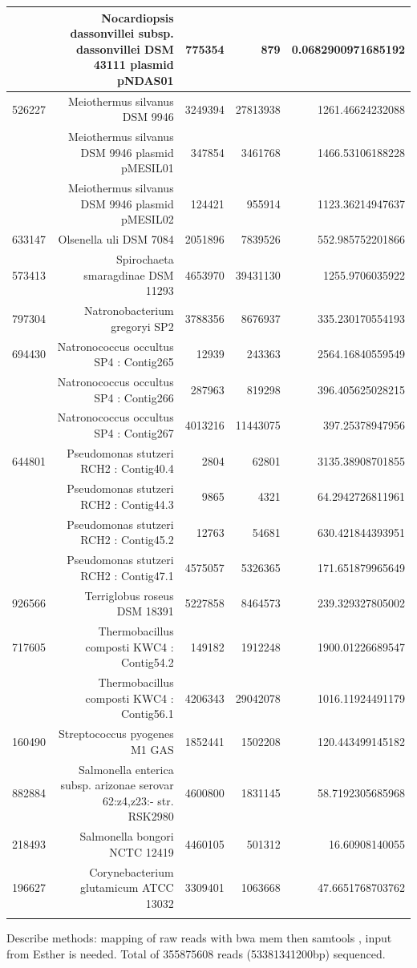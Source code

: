\documentclass{bioinfo2}
\begin{document}
\begin{table}[p]
{\begin{tabular}{lrrrr}
&Nocardiopsis dassonvillei subsp. dassonvillei DSM 43111 plasmid pNDAS01 & 775354 & 879 & 0.0682900971685192 \\
\hline
526227 & Meiothermus silvanus DSM 9946 & 3249394 & 27813938 & 1261.46624232088 \\
&Meiothermus silvanus DSM 9946 plasmid pMESIL01 & 347854 & 3461768 & 1466.53106188228 \\
&Meiothermus silvanus DSM 9946 plasmid pMESIL02 & 124421 & 955914 & 1123.36214947637 \\
\hline
633147 & Olsenella uli DSM 7084 & 2051896 & 7839526 & 552.985752201866 \\
\hline
573413 & Spirochaeta smaragdinae DSM 11293 & 4653970 & 39431130 & 1255.9706035922 \\
\hline
797304 & Natronobacterium gregoryi SP2 & 3788356 & 8676937 & 335.230170554193 \\
\hline
694430 & Natronococcus occultus SP4 : Contig265 & 12939 & 243363 & 2564.16840559549 \\
&Natronococcus occultus SP4 : Contig266 & 287963 & 819298 & 396.405625028215 \\
&Natronococcus occultus SP4 : Contig267 & 4013216 & 11443075 & 397.25378947956 \\
\hline
644801 & Pseudomonas stutzeri RCH2 : Contig40.4 & 2804 & 62801 & 3135.38908701855 \\
&Pseudomonas stutzeri RCH2 : Contig44.3 & 9865 & 4321 & 64.2942726811961 \\
&Pseudomonas stutzeri RCH2 : Contig45.2 & 12763 & 54681 & 630.421844393951 \\
&Pseudomonas stutzeri RCH2 : Contig47.1 & 4575057 & 5326365 & 171.651879965649 \\
\hline
926566 & Terriglobus roseus DSM 18391 & 5227858 & 8464573 & 239.329327805002 \\
\hline
717605 & Thermobacillus composti KWC4 : Contig54.2 & 149182 & 1912248 & 1900.01226689547 \\
&Thermobacillus composti KWC4 : Contig56.1 & 4206343 & 29042078 & 1016.11924491179 \\
\hline
160490 & Streptococcus pyogenes M1 GAS & 1852441 & 1502208 & 120.443499145182 \\
\hline
882884 & Salmonella enterica subsp. arizonae serovar 62:z4,z23:- str. RSK2980 & 4600800 & 1831145 & 58.7192305685968 \\
\hline
218493 & Salmonella bongori NCTC 12419 & 4460105 & 501312 & 16.60908140055 \\
\hline
196627 & Corynebacterium glutamicum ATCC 13032 & 3309401 & 1063668 & 47.6651768703762 \\
\botrule
\end{tabular}}{Describe methods: mapping of raw reads with bwa mem \citep{bwamem} then samtools \citep{samtools},
input from Esther is needed. 
Total of 355875608 reads (53381341200bp) sequenced.
}
\end{table}
\end{document}

